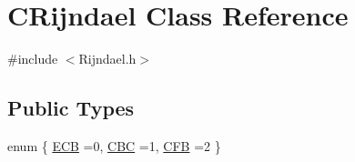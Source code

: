 \hypertarget{classCRijndael}{\section{C\-Rijndael Class Reference}
\label{classCRijndael}
}


{\ttfamily \#include $<$Rijndael.\-h$>$}

\subsection*{Public Types}
\begin{DoxyCompactItemize}
\item 
enum \{ \hyperlink{classCRijndael_ac1444c814f491f48deb465ef667581d2a45277dc10dfb5fb3b29dd622f2fa95e1}{E\-C\-B} =0, 
\hyperlink{classCRijndael_ac1444c814f491f48deb465ef667581d2a0e8f618dfec3ca34a604ed2ec597b4be}{C\-B\-C} =1, 
\hyperlink{classCRijndael_ac1444c814f491f48deb465ef667581d2aeae0d000ef07f3925d0f8d52f5768f64}{C\-F\-B} =2
 \}
\end{DoxyCompactItemize}
